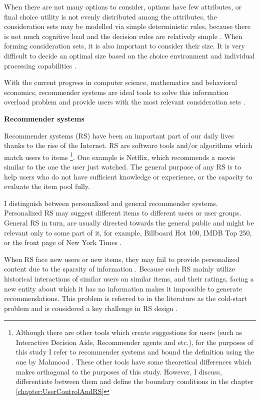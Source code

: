 \documentclass[a4paper,12pt]{article}
\newcommand{\citeyearonly}[1]{\citeyearpar{#1}}
\begin{document}
When there are not many options to consider, options have few attributes, or final choice utility is not evenly distributed among the attributes, the consideration sets may be modelled via simple deterministic rules, because there is not much cognitive load and the decision rules are relatively simple  \citep{hauser2014consideration, lee2004effect} . When forming consideration sets, it is also important to consider their size. It is very difficult to decide an optimal size based on the choice environment and individual processing capabilities \citep{de2011modelling}. 

With the current progress in computer science, mathematics and behavioral economics, recommender systems are ideal tools to solve this information overload problem and provide users with the most relevant consideration sets \citep{breese2013empirical}.

    
\textbf{Recommender systems}    

Recommender systems (RS) have been an important part of our daily lives thanks to the rise of the Internet. RS are software tools and/or algorithms which match users to items \citep{mahmood2009improving} \footnote{Although there are other tools which create suggestions for users (such as Interactive Decision Aids, Recommender agents and etc.), for the purposes of this study I refer to recommender systems and bound the definition using the one by Mahmood \citeyearonly{mahmood2009improving}. These other tools have some theoretical differences which makes orthogonal to the purposes of this study. However, I discuss, differentiate between them and define the boundary conditions in the chapter \ref{chapter:UserControlAndRS}}. One example is Netflix, which recommends a movie similar to the one the user just watched. The general purpose of any RS is to help users who do not have sufficient knowledge or experience, or the capacity to evaluate the item pool fully. 

I distinguish between personalized and general recommender systems. Personalized RS  may suggest different items to different users or user groups. General RS in turn, are usually directed towards the general public and might be relevant only to some part of it, for example, Billboard Hot 100, IMDB Top 250, or the front page of New York Times \citep{ricci2010recsystems}.

When RS face new users or new items, they may fail to provide personalized content due to the sparsity of information \citep{lika2014facing}. Because such RS mainly utilize historical interactions of similar users on similar items, and their ratings, facing a new entity about which it has no information makes it impossible to generate recommendations. This problem is referred to in the literature as the cold-start problem \citep{adomavicius2005toward} and is considered a key challenge in RS design \citep{park2009pairwise}.
\end{document}
